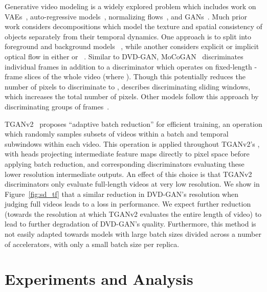 \documentclass{article} \usepackage{iclr2020_conference,times}
\begin{document}
Generative video modeling is a widely explored problem which includes work on VAEs~\citep{babaeizadeh2017stochastic, denton2018stochastic, lee2018stochastic, NIPS2018_7333},
auto-regressive models~\citep{ranzato14video,srivastava15unsupervised,kalchbrenner2017video, weissenborn2019scaling}, normalizing flows~\citep{kumar2019videoflow}, and GANs~\citep{mathieu2015deep, vondrick2016generating, saito2017temporal, saito2018tganv2}. Much prior work considers decompositions which model the texture and spatial consistency of objects separately from their temporal dynamics. One approach is to split  into foreground and background models ~\citep{vondrick2016generating, spampinato2018vos}, while another considers explicit or implicit optical flow in either  or ~\citep{saito2017temporal, ohnishi2018hierarchical}. 
Similar to DVD-GAN, MoCoGAN~\citep{tulyakov2018mocogan} discriminates individual frames in addition to a discriminator which operates on fixed-length -frame slices of the whole video (where ). Though this potentially reduces the number of pixels to discriminate to , \citet{tulyakov2018mocogan} describes discriminating sliding windows, which increases the total number of pixels. Other models follow this approach by discriminating groups of frames~\citep{xie2018tempogan, sun2018two, balaji2018tfgan}.

TGANv2~\citep{saito2018tganv2} proposes ``adaptive batch reduction'' for efficient training, an operation which randomly samples subsets of videos within a batch and temporal subwindows within each video. This operation is applied throughout TGANv2's , with heads projecting intermediate feature maps directly to pixel space before applying batch reduction, and corresponding discriminators evaluating these lower resolution intermediate outputs. An effect of this choice is that TGANv2 discriminators only evaluate full-length videos at very low resolution. We show in Figure~\ref{fig:sd_tf} that a similar reduction in DVD-GAN's resolution when judging full videos leads to a loss in performance. We expect further reduction (towards the resolution at which TGANv2 evaluates the entire length of video) to lead to further degradation of DVD-GAN's quality. Furthermore, this method is not easily adapted towards models with large batch sizes divided across a number of accelerators, with only a small batch size per replica.

\section{Experiments and Analysis} 
\end{document}
